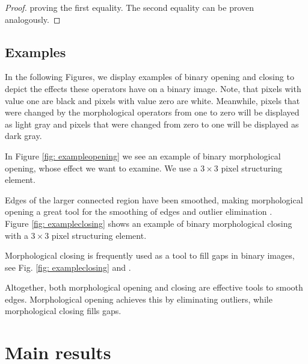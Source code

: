 \documentclass[a4paper,12pt]{article}
\theoremstyle{plain}
\theoremstyle{definition}
\begin{document}
\begin{proof}
	proving the first equality. The second equality can be proven analogously.
\end{proof}



\subsection{Examples}\label{section: morphologyexamples}

In the following Figures, we display examples of binary opening and closing to depict the effects these operators have on a binary image. Note, that pixels with value one are black and pixels with value zero are white. Meanwhile, pixels that were changed by the morphological operators from one to zero will be displayed as light gray and pixels that were changed from zero to one will be displayed as dark gray.

In Figure \ref{fig: exampleopening} we see an example of binary morphological opening, whose effect we want to examine. We use a $3 \times 3$ pixel structuring element.



Edges of the larger connected region have been smoothed, making morphological opening a great tool for the smoothing of edges and outlier elimination \cite[p.~69]{imageprocessing}.\\

Figure \ref{fig: exampleclosing} shows an example of binary morphological closing with a $3 \times 3$ pixel structuring element.



Morphological closing is frequently used as a tool to fill gaps in binary images, see Fig. \ref{fig: exampleclosing} and \cite[p.~69]{imageprocessing}.

Altogether, both morphological opening and closing are effective tools to smooth edges. Morphological opening achieves this by eliminating outliers, while morphological closing fills gaps.

\newpage



\section{Main results}\label{section: mainresults}
\end{document}
